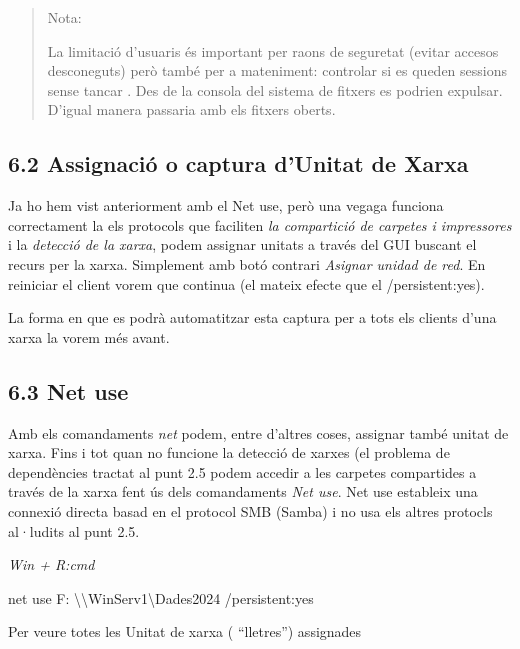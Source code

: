 \documentclass[
  a4paper,
]{article}
\newenvironment{Shaded}{\begin{snugshade}}{\end{snugshade}}
\newcommand{\AttributeTok}[1]{\textcolor[rgb]{0.13,0.29,0.53}{#1}}
\newcommand{\NormalTok}[1]{#1}
\begin{document}
\begin{quote}
Nota:

La limitació d'usuaris és important per raons de seguretat (evitar
accesos desconeguts) però també per a mateniment: controlar si es queden
sessions sense tancar . Des de la consola del sistema de fitxers es
podrien expulsar. D'igual manera passaria amb els fitxers oberts.
\end{quote}

\subsection{6.2 Assignació o captura d'Unitat de
Xarxa}\label{assignaciuxf3-o-captura-dunitat-de-xarxa}

Ja ho hem vist anteriorment amb el Net use, però una vegaga funciona
correctament la els protocols que faciliten \emph{la compartició de
carpetes i impressores} i la \emph{detecció de la xarxa}, podem assignar
unitats a través del GUI buscant el recurs per la xarxa. Simplement amb
botó contrari \emph{Asignar unidad de red}. En reiniciar el client vorem
que continua (el mateix efecte que el /persistent:yes).

La forma en que es podrà automatitzar esta captura per a tots els
clients d'una xarxa la vorem més avant.

\subsection{6.3 Net use}\label{net-use}

Amb els comandaments \emph{net} podem, entre d'altres coses, assignar
també unitat de xarxa. Fins i tot quan no funcione la detecció de xarxes
(el problema de dependències tractat al punt 2.5 podem accedir a les
carpetes compartides a través de la xarxa fent ús dels comandaments
\emph{Net use}. Net use estableix una connexió directa basad en el
protocol SMB (Samba) i no usa els altres protocls al·ludits al punt 2.5.

\emph{Win + R:cmd}

\begin{Shaded}
\begin{Highlighting}[]
\NormalTok{net use F: \textbackslash{}\textbackslash{}WinServ1\textbackslash{}Dades2024 }\AttributeTok{/persistent:}\NormalTok{yes}
\end{Highlighting}
\end{Shaded}

Per veure totes les Unitat de xarxa ( ``lletres'') assignades
\end{document}
